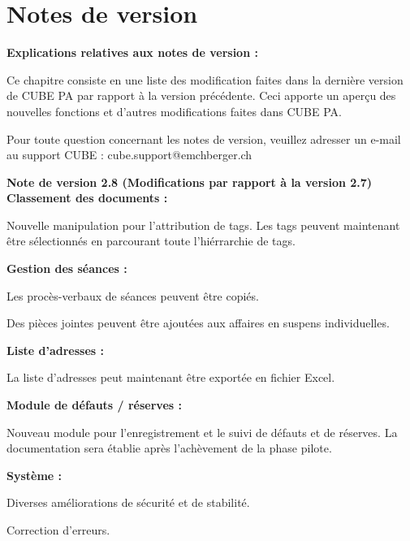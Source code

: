 
\clearpage
\section{Notes de version}

\textbf{Explications relatives aux notes de version :}

\vspace{\baselineskip}

Ce chapitre consiste en une liste des modification faites dans la dernière version de CUBE PA par rapport à la version précédente. Ceci apporte un aperçu des nouvelles fonctions et d'autres modifications faites dans CUBE PA.

\vspace{\baselineskip}

Pour toute question concernant les notes de version, veuillez adresser un e-mail au support CUBE : {\color{red} cube.support@emchberger.ch}

\vspace{\baselineskip}

\textbf{Note de version 2.8 (Modifications par rapport à la version 2.7)} \\
\textbf{Classement des documents :}
\begin{compactitem}
	\item Nouvelle manipulation pour l'attribution de tags. Les tags peuvent maintenant être sélectionnés en parcourant toute l'hiérrarchie de tags.
\end{compactitem}
\textbf{Gestion des séances :}
\begin{compactitem}
	\item Les procès-verbaux de séances peuvent être copiés.
	\item Des pièces jointes peuvent être ajoutées aux affaires en suspens individuelles.
\end{compactitem}
\textbf{Liste d'adresses :}
\begin{compactitem}
	\item La liste d'adresses peut maintenant être exportée en fichier Excel.
\end{compactitem}
\textbf{Module de défauts / réserves :}
\begin{compactitem}
	\item Nouveau module pour l'enregistrement et le suivi de défauts et de réserves. La documentation sera établie après l'achèvement de la phase pilote.
\end{compactitem}
\textbf{Système :}
\begin{compactitem}
	\item Diverses améliorations de sécurité et de stabilité.
	\item Correction d'erreurs.
\end{compactitem}
\vspace{\baselineskip}

